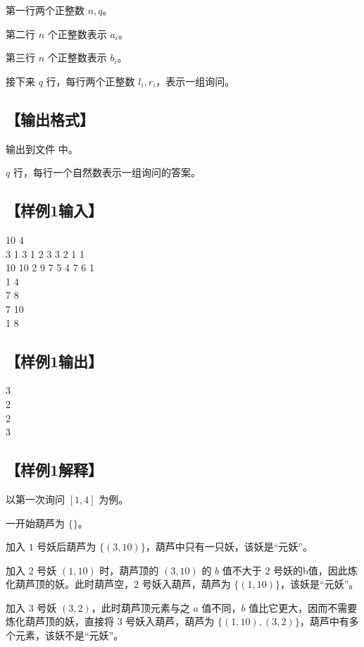 \documentclass{statement}
\begin{document}
    第一行两个正整数 $n,q$。

	第二行 $n$ 个正整数表示 $a_i$。

	第三行 $n$ 个正整数表示 $b_i$。

	接下来 $q$ 行，每行两个正整数 $l_i, r_i$，表示一组询问。


    

    \subsection[输出格式]{【输出格式】}
    输出到文件  中。

    $q$ 行，每行一个自然数表示一组询问的答案。

    \subsection[样例1输入]{【样例1输入】}
    \begin{example}
10 4\\
3 1 3 1 2 3 3 2 1 1\\
10 10 2 9 7 5 4 7 6 1\\
1 4\\
7 8\\
7 10\\
1 8
    \end{example}

    \subsection[样例1输出]{【样例1输出】}
    \begin{example}
3\\
2\\
2\\
3
    \end{example}
    \subsection[样例1解释]{【样例1解释】}
    以第一次询问 $[1, 4]$ 为例。
    
    一开始葫芦为 $\{\}$。
    
    加入 $1$ 号妖后葫芦为 $\{(3, 10)\}$，葫芦中只有一只妖，该妖是“元妖”。
    
    加入 $2$ 号妖 $(1, 10)$ 时，葫芦顶的 $(3, 10)$ 的 $b$ 值不大于 $2$ 号妖的b值，因此炼化葫芦顶的妖。此时葫芦空，$2$
    号妖入葫芦，葫芦为 $\{(1, 10)\}$，该妖是“元妖”。
    
    加入 $3$ 号妖 $(3, 2)$，此时葫芦顶元素与之 $a$ 值不同，$b$ 值比它更大，因而不需要炼化葫芦顶的妖，直接将 $3$ 号妖入葫芦，葫芦为 $\{(1, 10),(3, 2)\}$，葫芦中有多个元素，该妖不是“元妖”。
    
\end{document}
